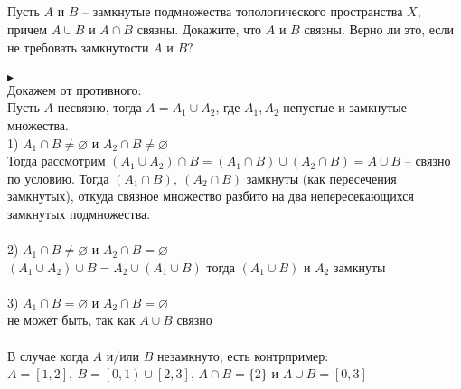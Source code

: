 \begin{comment}
			\\
			Теперь вернемся к задаче. Требуется доказать, что $\Gamma$ -- ретракт в $X \times Y$. Рассмотрим непрерывное отображение $\varphi:\ \Gamma \to Z$. Тогда композиция $g = \phi \circ h_{f} \circ p:\ X \times Y \to Z$, где $h_{f}: X \to$ $\Gamma$ -- гомеоморфизм $(x \mapsto f(x)) \Rightarrow$ взаимнооднозначно, компоненты отображения $h_{f}$ -- непрерывные отображения $\text{Id}: X \to X, \quad y = f(x) \Rightarrow h_{f}$ непрерывно, $h^{-1}_{f}:\ F \to X$ -- сужение проекции $p: X \times Y \to X$, на подпространстве $\Gamma$ совпадает с $\varphi. \quad \blacktriangleleft$\\
		\end{comment}
		
		
		
		\subsection{}
		Пусть $A$ и $B$ -- замкнутые подмножества топологического пространства $X$, причем $A \cup B$ и $A \cap B$ связны. Докажите, что $A$ и $B$ связны. Верно ли это, если не требовать замкнутости $A$ и $B?$\\
		\\
		$\blacktriangleright$\\
		Докажем от противного:\\
		Пусть $A$ несвязно, тогда $A = A_1 \cup A_2$, где $A_1, A_2$ непустые и замкнутые множества.\\
		1) $A_1 \cap B \ne \varnothing$ и $A_2 \cap B \ne \varnothing$\\
		Тогда рассмотрим $(A_1 \cup A_2) \cap B = (A_1 \cap B) \cup (A_2 \cap B) = A \cup B$ -- связно по условию. Тогда $(A_1 \cap B),\ (A_2 \cap B)$ замкнуты (как пересечения замкнутых), откуда связное множество разбито на два непересекающихся замкнутых подмножества.\\
		\\
		2) $A_1 \cap B \ne \varnothing$ и $A_2 \cap B = \varnothing$\\
		$(A_1 \cup A_2) \cup B = A_2 \cup (A_1 \cup B)$ тогда $(A_1 \cup B)$ и $A_2$ замкнуты\\
		\\
		3) $A_1 \cap B = \varnothing$ и $A_2 \cap B = \varnothing$\\
		не может быть, так как $A \cup B$ связно\\
		\\
		В случае когда $A$ и$\slash$или $B$ незамкнуто, есть контрпример: $A = [1, 2],\ B = \left[0, 1\right) \cup \left[2, 3\right]$, $A \cap B = \{2\}$ и $A \cup B = [0, 3]$\\
		
